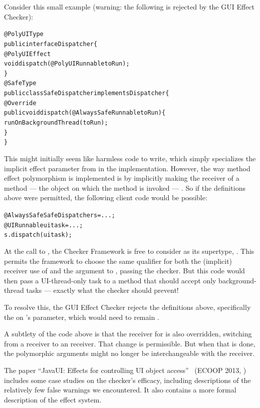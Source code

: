 Consider this small example (warning: the following is rejected by the GUI Effect Checker):

\begin{alltt}
@PolyUIType
public interface Dispatcher \{
    @PolyUIEffect
    void dispatch(@PolyUI Runnable toRun);
\}
@SafeType
public class SafeDispatcher implements Dispatcher \{
    @Override
    public void dispatch(@AlwaysSafe Runnable toRun) \{
        runOnBackgroundThread(toRun);
    \}
\}
\end{alltt}

This might initially seem like harmless code to write, which simply specializes the implicit effect
parameter from  in the  implementation.  However, the way
method effect polymorphism is implemented is by implicitly making the receiver of a
 method --- the object on which the method is invoked --- .  So
if the definitions above were permitted, the following client code would be possible:

\begin{alltt}
@AlwaysSafe SafeDispatcher s = ...;
@UI Runnable uitask = ...;
s.dispatch(uitask);
\end{alltt}

At the call to , the Checker Framework is free to consider  as its
supertype, .  This permits the framework to choose the same qualifier for
both the (implicit) receiver use of  and the  argument to
, passing the checker.  But this code would then pass a UI-thread-only
task to a method that should accept only background-thread tasks --- exactly what the checker
should prevent!

To resolve this, the GUI Effect Checker rejects the definitions above, specifically the
 on 's parameter, which would need to remain
.

A subtlety of the code above is that the receiver for  is also
overridden, switching from a  receiver to an  receiver.  That change is
permissible.  But when that is done, the polymorphic arguments might no longer be interchangeable
with the receiver.



The paper ``JavaUI: Effects for controlling UI object
access''~\cite{GordonDEG2013} (ECOOP 2013,
)
includes some case studies on the checker's efficacy, including
descriptions of the relatively few false warnings we encountered.  It also
contains a more formal description of the effect system.


